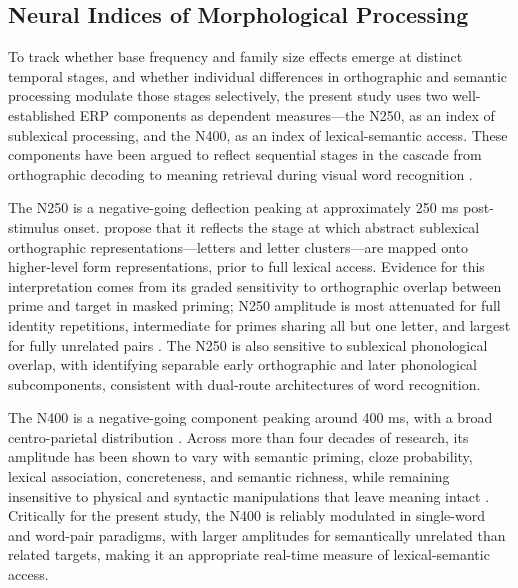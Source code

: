 \documentclass[utf8]{FrontiersinHarvard} %
\begin{document}
	
	\subsection{Neural Indices of Morphological Processing}
	
	To track whether base frequency and family size effects emerge at distinct temporal stages, and whether individual differences in orthographic and semantic processing modulate those stages selectively, the present study uses two well-established ERP components as dependent measures—the N250, as an index of sublexical processing, and the N400, as an index of lexical-semantic access. These components have been argued to reflect sequential stages in the cascade from orthographic decoding to meaning retrieval during visual word recognition \citep{graingerWatchingWordGo2009}.
	
	The N250 is a negative-going deflection peaking at approximately 250 ms post-stimulus onset. \citet{holcombTimeCourseVisual2006} propose that it reflects the stage at which abstract sublexical orthographic representations—letters and letter clusters—are mapped onto higher-level form representations, prior to full lexical access. Evidence for this interpretation comes from its graded sensitivity to orthographic overlap between prime and target in masked priming; N250 amplitude is most attenuated for full identity repetitions, intermediate for primes sharing all but one letter, and largest for fully unrelated pairs \citep{holcombTimeCourseVisual2006, holcomb_exploring_2007}. The N250 is also sensitive to sublexical phonological overlap, with \citet{graingerTimeCourseOrthographic2006} identifying separable early orthographic and later phonological subcomponents, consistent with dual-route architectures of word recognition.
	
	The N400 is a negative-going component peaking around 400 ms, with a broad centro-parietal distribution \citep{kutasReadingSenselessSentences1980}. Across more than four decades of research, its amplitude has been shown to vary with semantic priming, cloze probability, lexical association, concreteness, and semantic richness, while remaining insensitive to physical and syntactic manipulations that leave meaning intact \citep{kutasThirtyYearsCounting2011}. Critically for the present study, the N400 is reliably modulated in single-word and word-pair paradigms, with larger amplitudes for semantically unrelated than related targets, making it an appropriate real-time measure of lexical-semantic access.
	
\end{document}
